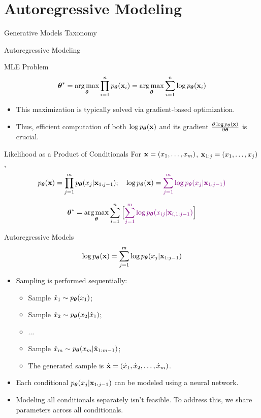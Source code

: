 \documentclass{beamer}
\begin{document}
\section{Autoregressive Modeling}
\begin{frame}{Generative Models Taxonomy}
\end{frame}
\begin{frame}{Autoregressive Modeling}
    \begin{block}{MLE Problem}
	    \vspace{-0.4cm}
	    $$
	        \boldsymbol{\theta}^* = \operatorname*{arg\,max}_{\boldsymbol{\theta}} \prod_{i=1}^n p_{\boldsymbol{\theta}}(\mathbf{x}_i) = \operatorname*{arg\,max}_{\boldsymbol{\theta}} \sum_{i=1}^n \log p_{\boldsymbol{\theta}}(\mathbf{x}_i)
	    $$
	    \vspace{-0.5cm}
    \end{block}
    \eqpause
    \begin{itemize}
        \item This maximization is typically solved via gradient-based optimization.
        \item Thus, efficient computation of both $\log p_{\boldsymbol{\theta}}(\mathbf{x})$ and its gradient $\frac{\partial \log p_{\boldsymbol{\theta}}(\mathbf{x})}{\partial \boldsymbol{\theta}}$ is crucial.
    \end{itemize}
    \eqpause
    \begin{block}{Likelihood as a Product of Conditionals}
    For $\mathbf{x} = (x_1, \dots, x_m)$, $\mathbf{x}_{1:j} = (x_1, \dots, x_j)$,
    $$
        p_{\boldsymbol{\theta}}(\mathbf{x}) = \prod_{j=1}^m p_{\boldsymbol{\theta}}(x_j | \mathbf{x}_{1:j - 1});\quad
        \log p_{\boldsymbol{\theta}}(\mathbf{x}) = {\color{violet}\sum_{j=1}^m \log p_{\boldsymbol{\theta}}(x_j | \mathbf{x}_{1:j - 1})}
    $$
    \end{block}
    \eqpause
    \vspace{-0.5cm}
	 $$
	     \boldsymbol{\theta}^* =  \operatorname*{arg\,max}_{\boldsymbol{\theta}} \sum_{i=1}^n \Big[{\color{violet} \sum_{j=1}^m \log p_{\boldsymbol{\theta}}(x_{ij} | \mathbf{x}_{i, 1:j - 1})}\Big]
	 $$
\end{frame}
\begin{frame}{Autoregressive Models}
    \[
    	\log p_{\boldsymbol{\theta}}(\mathbf{x}) = \sum_{j=1}^m \log p_{\boldsymbol{\theta}}(x_j | \mathbf{x}_{1:j - 1})
    \]
    \eqpause
    \begin{itemize}
	    \item Sampling is performed sequentially:
	    \begin{itemize}
    		\item Sample $\hat{x}_1 \sim p_{\boldsymbol{\theta}}(x_1)$;
    		\item Sample $\hat{x}_2 \sim p_{\boldsymbol{\theta}}(x_2 | \hat{x}_1)$;
    		\item $\ldots$
    		\item Sample $\hat{x}_m \sim p_{\boldsymbol{\theta}}(x_m | \hat{\mathbf{x}}_{1:m-1})$;
    		\item The generated sample is $\hat{\mathbf{x}} = (\hat{x}_1, \hat{x}_2, \ldots, \hat{x}_m)$.
    	\end{itemize}
        \eqpause
        \item Each conditional $p_{\boldsymbol{\theta}}(x_j | \mathbf{x}_{1:j - 1})$ can be modeled using a neural network.
        \eqpause
        \item Modeling all conditionals separately isn't feasible. To address this, we share parameters across all conditionals.
    \end{itemize}
\end{frame}
\end{document}
